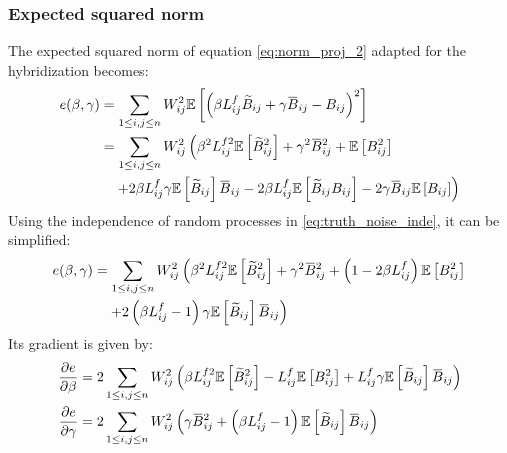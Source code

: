 \documentclass[12pt]{scrartcl}
\newcommand{\overbar}[1]{\mkern 1.5mu\overline{\mkern-1.5mu#1\mkern-1.5mu}\mkern 1.5mu}
\begin{document}
\subsubsection{Expected squared norm}
The expected squared norm of equation \eqref{eq:norm_proj_2} adapted for the hybridization becomes:
\begin{align}
e(\beta,\gamma) & = \sum_{1 \le i,j \le n} W_{ij}^2 \mathbb{E}\left[ \left(\beta L^f_{ij} \widetilde{B}_{ij} + \gamma \overbar{B}_{ij} - B_{ij} \right)^2 \right] \nonumber \\
& = \sum_{1 \le i,j \le n} W_{ij}^2 \left(\beta^2 L^{f2}_{ij} \mathbb{E} \left[\widetilde{B}_{ij}^2\right] + \gamma^2 \overbar{B}_{ij}^2 + \mathbb{E} \left[B^2_{ij}\right] \right. \nonumber \\
& \left. \quad + 2 \beta L^f_{ij} \gamma \mathbb{E} \left[\widetilde{B}_{ij}\right] \overbar{B}_{ij} - 2 \beta L^f_{ij} \mathbb{E} \left[\widetilde{B}_{ij} B_{ij}\right] - 2 \gamma \overbar{B}_{ij} \mathbb{E} \left[B_{ij}\right] \right)
\end{align}
Using the independence of random processes in \eqref{eq:truth_noise_inde}, it can be simplified:
\begin{align}
e(\beta,\gamma) & = \sum_{1 \le i,j \le n} W_{ij}^2 \left(\beta^2 L^{f2}_{ij} \mathbb{E} \left[\widetilde{B}_{ij}^2\right] + \gamma^2 \overbar{B}_{ij}^2 + \left(1 - 2 \beta L^f_{ij}\right) \mathbb{E} \left[B^2_{ij}\right] \right. \nonumber \\
& \left. \quad + 2 \left(\beta L^f_{ij} - 1\right) \gamma \mathbb{E} \left[\widetilde{B}_{ij}\right] \overbar{B}_{ij} \right)
\end{align}
Its gradient is given by:
\begin{subequations}
\begin{align}
\frac{\partial e}{\partial \beta} & = 2 \sum_{1 \le i,j \le n} W_{ij}^2 \left(\beta L^{f2}_{ij} \mathbb{E} \left[\widetilde{B}_{ij}^2\right] - L^f_{ij} \mathbb{E} \left[B^2_{ij}\right] + L^f_{ij} \gamma \mathbb{E} \left[\widetilde{B}_{ij}\right] \overbar{B}_{ij} \right) \\
\frac{\partial e}{\partial \gamma} & = 2 \sum_{1 \le i,j \le n} W_{ij}^2 \left(\gamma \overbar{B}_{ij}^2 + \left(\beta L^f_{ij} - 1\right) \mathbb{E} \left[\widetilde{B}_{ij}\right] \overbar{B}_{ij} \right)
\end{align}
\end{subequations}
\end{document}
